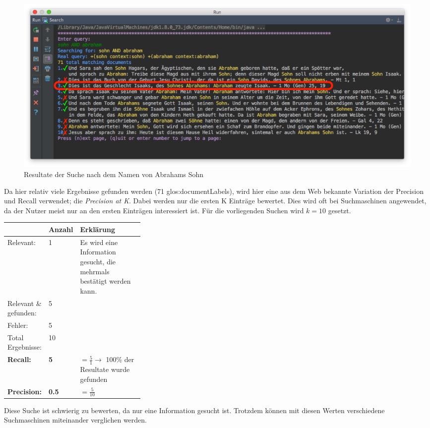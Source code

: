 \begin{figure}[H]
	\centering
	\includegraphics[width=1.0\textwidth]{images/4-comparison/search_result_abraham.png}
	\caption{Resultate der Suche nach dem Namen von Abrahams Sohn}
\end{figure}

Da hier relativ viele Ergebnisse gefunden werden (71 \glspl{glos:documentLabel}), wird hier eine aus dem Web bekannte Variation der Precision und Recall verwendet; die \textit{Precision at K}. Dabei werden nur die ersten K Einträge bewertet. Dies wird oft bei Suchmaschinen angewendet, da der Nutzer meist nur an den ersten Einträgen interessiert ist.
Für die vorliegenden Suchen wird $k = 10$ gesetzt.

\begin{table}[H]
	\centering
	\small\renewcommand{\arraystretch}{1.4}
	\begin{tabularx}{0.9\textwidth}{ L{0.22\linewidth} | L{0.1\linewidth} | X }%
		\hline
		& Anzahl & Erklärung \\ \hline \hline
		Relevant: & 1 & Es wird eine Information gesucht, die mehrmals bestätigt werden kann.\\
		Relevant \& gefunden: & 5 & \\
		Fehler: & 5 & \\
		Total Ergebnisse: & 10 & \\
		\hline
		\textbf{Recall:} & \textbf{5} & $= \frac{5}{1} \rightarrow$ 100\% der Resultate wurde gefunden\\
		\textbf{Precision:} & \textbf{0.5} & $= \frac{5}{10}$ \\
		\hline\hline
	\end{tabularx}
\end{table}

Diese Suche ist schwierig zu bewerten, da nur eine Information gesucht ist. Trotzdem können mit diesen Werten verschiedene Suchmaschinen miteinander verglichen werden.

